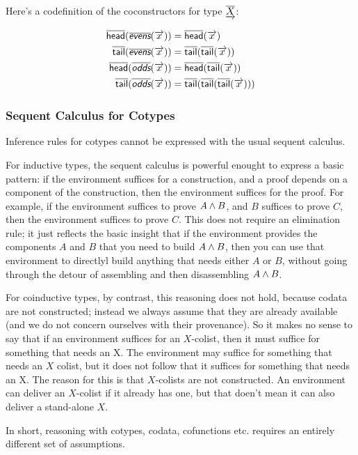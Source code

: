 \documentclass{article}
\begin{document}
Here's a codefinition of the coconstructors for type \(\underrightarrow{\overline{X}}\):

\begin{align}
  \cohead(\codefn{evens}(\coseq{x})) & = \cohead(\coseq{x}) \\
  \cotail(\codefn{evens}(\coseq{x})) & = \cotail(\cotail(\coseq{x})) \\
  \cohead(\codefn{odds}(\coseq{x})) & = \cohead(\cotail(\coseq{x})) \\
  \cotail(\codefn{odds}(\coseq{x})) & = \cotail(\cotail(\cotail(\coseq{x})))
\end{align}

\subsubsection{Sequent Calculus for Cotypes}

Inference rules for cotypes cannot be expressed with the usual sequent
calculus.

For inductive types, the sequent calculus is powerful enought to
express a basic pattern: if the environment suffices for a
construction, and a proof depends on a component of the construction,
then the environment suffices for the proof. For example, if the
environment suffices to prove \(A\land B\), and \(B\) suffices to
prove \(C\), then the environment suffices to prove \(C\). This does
not require an elimination rule; it just reflects the basic insight
that if the environment provides the components \(A\) and \(B\) that
you need to build \(A\land B\), then you can use that environment to
directlyl build anything that needs either \(A\) or \(B\), without
going through the detour of assembling and then disassembling
\(A\land B\).

For coinductive types, by contrast, this reasoning does not hold,
because codata are not constructed; instead we always assume that they
are already available (and we do not concern ourselves with their
provenance). So it makes no sense to say that if an environment
suffices for an \(X\)-colist, then it must suffice for something that
needs an X. The environment may suffice for something that needs an
\(X\) colist, but it does not follow that it suffices for something
that needs an X. The reason for this is that \(X\)-colists are not
constructed. An environment can deliver an \(X\)-colist if it already
has one, but that doen't mean it can also deliver a stand-alone \(X\).

In short, reasoning with cotypes, codata, cofunctions etc. requires an
entirely different set of assumptions.
\end{document}
